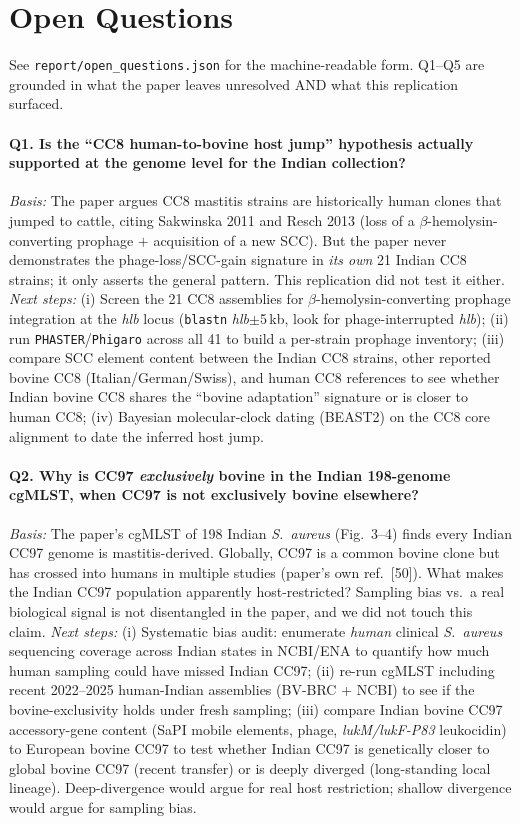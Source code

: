 \documentclass[11pt]{article}
\begin{document}
\section{Open Questions}\label{sec:openq}
See \texttt{report/open\_questions.json} for the machine-readable form.
Q1--Q5 are grounded in what the paper leaves unresolved AND what this
replication surfaced.

\paragraph{Q1. Is the ``CC8 human-to-bovine host jump'' hypothesis actually
supported at the genome level for the Indian collection?}
\emph{Basis:} The paper argues CC8 mastitis strains are historically human
clones that jumped to cattle, citing Sakwinska 2011 and Resch 2013 (loss of a
$\beta$-hemolysin-converting prophage $+$ acquisition of a new SCC). But the
paper never demonstrates the phage-loss/SCC-gain signature in \emph{its own}
21 Indian CC8 strains; it only asserts the general pattern. This replication
did not test it either.
\emph{Next steps:} (i) Screen the 21 CC8 assemblies for
$\beta$-hemolysin-converting prophage integration at the \emph{hlb} locus
(\texttt{blastn} \emph{hlb}$\pm$5\,kb, look for phage-interrupted
\emph{hlb}); (ii) run \texttt{PHASTER}/\texttt{Phigaro} across all 41 to build
a per-strain prophage inventory; (iii) compare SCC element content between the
Indian CC8 strains, other reported bovine CC8 (Italian/German/Swiss), and
human CC8 references to see whether Indian bovine CC8 shares the ``bovine
adaptation'' signature or is closer to human CC8; (iv) Bayesian
molecular-clock dating (BEAST2) on the CC8 core alignment to date the
inferred host jump.

\paragraph{Q2. Why is CC97 \emph{exclusively} bovine in the Indian
198-genome cgMLST, when CC97 is not exclusively bovine elsewhere?}
\emph{Basis:} The paper's cgMLST of 198 Indian \emph{S.\ aureus} (Fig.\ 3--4)
finds every Indian CC97 genome is mastitis-derived. Globally, CC97 is a
common bovine clone but has crossed into humans in multiple studies (paper's
own ref.\ [50]). What makes the Indian CC97 population apparently
host-restricted? Sampling bias vs.\ a real biological signal is not
disentangled in the paper, and we did not touch this claim.
\emph{Next steps:} (i) Systematic bias audit: enumerate \emph{human} clinical
\emph{S.\ aureus} sequencing coverage across Indian states in NCBI/ENA to
quantify how much human sampling could have missed Indian CC97; (ii) re-run
cgMLST including recent 2022--2025 human-Indian assemblies (BV-BRC + NCBI)
to see if the bovine-exclusivity holds under fresh sampling; (iii) compare
Indian bovine CC97 accessory-gene content (SaPI mobile elements, phage,
\emph{lukM/lukF-P83} leukocidin) to European bovine CC97 to test whether
Indian CC97 is genetically closer to global bovine CC97 (recent transfer)
or is deeply diverged (long-standing local lineage). Deep-divergence would
argue for real host restriction; shallow divergence would argue for sampling
bias.
\end{document}
